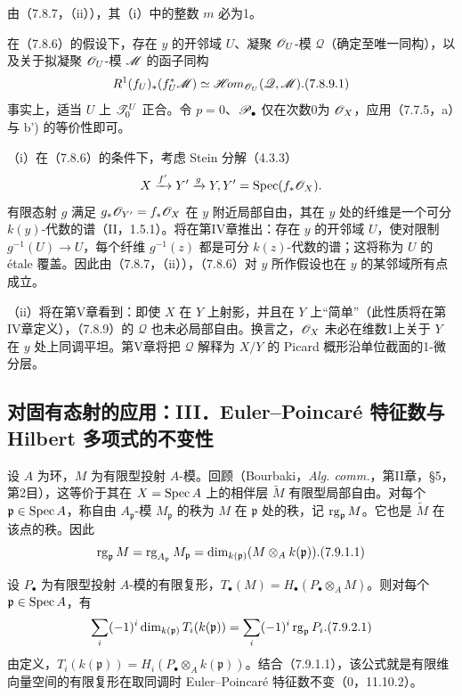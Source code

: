 由（7.8.7，（ii）），其（i）中的整数 $m$ 必为1。

在（7.8.6）的假设下，存在 $y$ 的开邻域 $U$、凝聚 $\mathscr O_U$-模 $\mathscr Q$（确定至唯一同构），以及关于拟凝聚 $\mathscr O_U$-模 $\mathscr M$ 的函子同构
\begin{equation}
 R^1(f_U)_*(f_U^*\M)\simeq\shHom_{\OO_U}(\mathscr Q,\M).
 \tag{7.8.9.1}
\end{equation}
事实上，适当 $U$ 上 $\mathscr T_0^U$ 正合。令 $p=0$、$\mathscr P_\bullet$ 仅在次数0为 $\mathscr O_X$，应用（7.7.5，a）与 b') 的等价性即可。

（i）在（7.8.6）的条件下，考虑 Stein 分解（4.3.3）
\[
 X\xrightarrow{f'}Y'\xrightarrow{g}Y,
  Y'=\operatorname{Spec}(f_*\mathscr O_X).
\]
有限态射 $g$ 满足 $g_*\mathscr O_{Y'}=f_*\mathscr O_X$ 在 $y$ 附近局部自由，其在 $y$ 处的纤维是一个可分 $k(y)$-代数的谱（II，1.5.1）。将在第IV章推出：存在 $y$ 的开邻域 $U$，使对限制 $g^{-1}(U)\to U$，每个纤维 $g^{-1}(z)$ 都是可分 $k(z)$-代数的谱；这将称为 $U$ 的 étale 覆盖。因此由（7.8.7，（ii）），（7.8.6）对 $y$ 所作假设也在 $y$ 的某邻域所有点成立。

（ii）将在第V章看到：即使 $X$ 在 $Y$ 上射影，并且在 $Y$ 上“简单”（此性质将在第IV章定义），（7.8.9）的 $\mathscr Q$ 也未必局部自由。换言之，$\mathscr O_X$ 未必在维数1上关于 $Y$ 在 $y$ 处上同调平坦。第V章将把 $\mathscr Q$ 解释为 $X/Y$ 的 Picard 概形沿单位截面的1-微分层。

\subsection{对固有态射的应用：III．Euler--Poincaré 特征数与 Hilbert 多项式的不变性}

设 $A$ 为环，$M$ 为有限型投射 $A$-模。回顾（Bourbaki，\textit{Alg. comm.}，第II章，§5，第2目），这等价于其在 $X=\operatorname{Spec} A$ 上的相伴层 $\widetilde M$ 有限型局部自由。对每个 $\mathfrak p\in\operatorname{Spec} A$，称自由 $A_{\mathfrak p}$-模 $M_{\mathfrak p}$ 的秩为 $M$ 在 $\mathfrak p$ 处的秩，记 $\operatorname{rg}_{\mathfrak p}M$。它也是 $\widetilde M$ 在该点的秩。因此
\begin{equation}
 \rk_{\mathfrak p}M=\rk_{A_{\mathfrak p}}M_{\mathfrak p}
 =\dim_{k(\mathfrak p)}(M\otimes_A k(\mathfrak p)).\tag{7.9.1.1}
\end{equation}

设 $P_\bullet$ 为有限型投射 $A$-模的有限复形，$T_\bullet(M)=H_\bullet(P_\bullet\otimes_A M)$。则对每个 $\mathfrak p\in\operatorname{Spec} A$，有
\begin{equation}
 \sum_i(-1)^i\dim_{k(\mathfrak p)}T_i(k(\mathfrak p))
 =\sum_i(-1)^i\rk_{\mathfrak p}P_i.\tag{7.9.2.1}
\end{equation}
由定义，$T_i(k(\mathfrak p))=H_i(P_\bullet\otimes_A k(\mathfrak p))$。结合（7.9.1.1），该公式就是有限维向量空间的有限复形在取同调时 Euler--Poincaré 特征数不变（0，11.10.2）。

